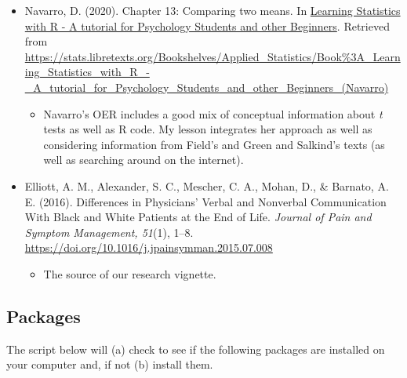 \documentclass[
  11pt,
]{book}
\providecommand{\tightlist}{%
  \setlength{\itemsep}{0pt}\setlength{\parskip}{0pt}}
\begin{document}
\begin{itemize}
\tightlist
\item
  Navarro, D. (2020). Chapter 13: Comparing two means. In \href{https://learningstatisticswithr.com/}{Learning Statistics with R - A tutorial for Psychology Students and other Beginners}. Retrieved from \url{https://stats.libretexts.org/Bookshelves/Applied_Statistics/Book\%3A_Learning_Statistics_with_R_-_A_tutorial_for_Psychology_Students_and_other_Beginners_(Navarro)}

  \begin{itemize}
  \tightlist
  \item
    Navarro's OER includes a good mix of conceptual information about \emph{t} tests as well as R code. My lesson integrates her approach as well as considering information from Field's \citeyearpar{field_discovering_2012} and Green and Salkind's \citeyearpar{green_using_2014} texts (as well as searching around on the internet).
  \end{itemize}
\item
  Elliott, A. M., Alexander, S. C., Mescher, C. A., Mohan, D., \& Barnato, A. E. (2016). Differences in Physicians' Verbal and Nonverbal Communication With Black and White Patients at the End of Life. \emph{Journal of Pain and Symptom Management, 51}(1), 1--8. \url{https://doi.org/10.1016/j.jpainsymman.2015.07.008}

  \begin{itemize}
  \tightlist
  \item
    The source of our research vignette.
  \end{itemize}
\end{itemize}

\hypertarget{packages-2}{%
\subsection{Packages}\label{packages-2}}

The script below will (a) check to see if the following packages are installed on your computer and, if not (b) install them.
\end{document}
